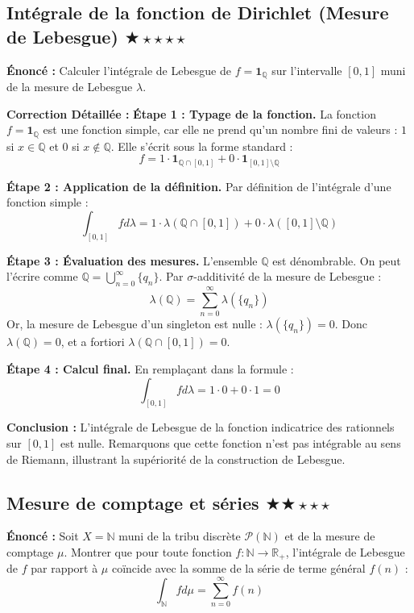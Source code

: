 \documentclass[11pt,a4paper]{article}
\begin{document}
\subsection*{Int\'egrale de la fonction de Dirichlet (Mesure de Lebesgue) \quad $\bigstar\star\star\star\star$}

\textbf{Énonc\'e :}
Calculer l'int\'egrale de Lebesgue de $f = \mathbf{1}_\mathbb{Q}$ sur l'intervalle $[0, 1]$ muni de la mesure de Lebesgue $\lambda$.

\textbf{Correction D\'etaill\'ee :}
\textbf{Étape 1 : Typage de la fonction.}
La fonction $f = \mathbf{1}_\mathbb{Q}$ est une fonction simple, car elle ne prend qu'un nombre fini de valeurs : $1$ si $x \in \mathbb{Q}$ et $0$ si $x \notin \mathbb{Q}$.
Elle s'\'ecrit sous la forme standard :
$$f = 1 \cdot \mathbf{1}_{\mathbb{Q} \cap [0,1]} + 0 \cdot \mathbf{1}_{[0,1] \setminus \mathbb{Q}}$$

\textbf{Étape 2 : Application de la d\'efinition.}
Par d\'efinition de l'int\'egrale d'une fonction simple :
$$\int_{[0,1]} f d\lambda = 1 \cdot \lambda(\mathbb{Q} \cap [0,1]) + 0 \cdot \lambda([0,1] \setminus \mathbb{Q})$$

\textbf{Étape 3 : Évaluation des mesures.}
L'ensemble $\mathbb{Q}$ est d\'enombrable. On peut l'\'ecrire comme $\mathbb{Q} = \bigcup_{n=0}^\infty \{q_n\}$.
Par $\sigma$-additivit\'e de la mesure de Lebesgue :
$$\lambda(\mathbb{Q}) = \sum_{n=0}^\infty \lambda(\{q_n\})$$
Or, la mesure de Lebesgue d'un singleton est nulle : $\lambda(\{q_n\}) = 0$.
Donc $\lambda(\mathbb{Q}) = 0$, et a fortiori $\lambda(\mathbb{Q} \cap [0,1]) = 0$.

\textbf{Étape 4 : Calcul final.}
En remplaçant dans la formule :
$$\int_{[0,1]} f d\lambda = 1 \cdot 0 + 0 \cdot 1 = 0$$

\textbf{Conclusion :}
L'int\'egrale de Lebesgue de la fonction indicatrice des rationnels sur $[0,1]$ est nulle. Remarquons que cette fonction n'est pas int\'egrable au sens de Riemann, illustrant la sup\'eriorit\'e de la construction de Lebesgue.


\subsection*{Mesure de comptage et s\'eries \quad $\bigstar\bigstar\star\star\star$}

\textbf{Énonc\'e :}
Soit $X = \mathbb{N}$ muni de la tribu discr\`ete $\mathcal{P}(\mathbb{N})$ et de la mesure de comptage $\mu$.
Montrer que pour toute fonction $f : \mathbb{N} \to \mathbb{R}_+$, l'int\'egrale de Lebesgue de $f$ par rapport \`a $\mu$ coïncide avec la somme de la s\'erie de terme g\'en\'eral $f(n)$ :
$$\int_{\mathbb{N}} f d\mu = \sum_{n=0}^\infty f(n)$$
\end{document}
